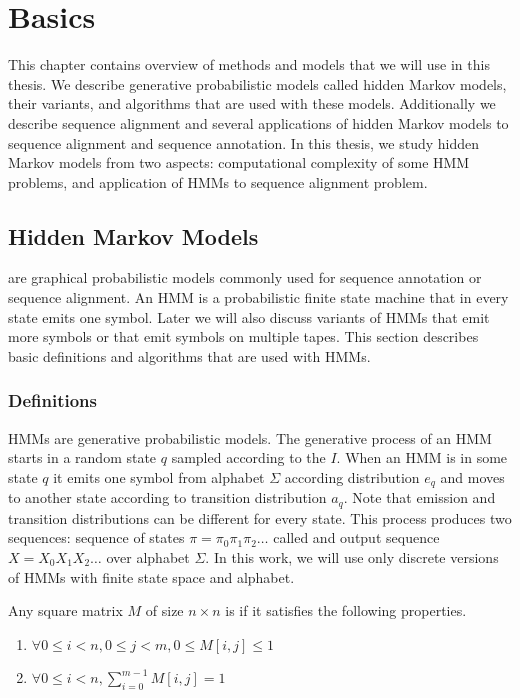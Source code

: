 \chapter{Basics}
\label{CHAPTER:BASICS}

This chapter contains overview of methods and models that we will use in this
thesis. We describe generative probabilistic models called hidden Markov
models, their variants, and algorithms that are used with these models.
Additionally we describe sequence alignment and several applications of hidden
Markov models to sequence alignment and sequence annotation. In this thesis, we
study hidden Markov models from two aspects: computational complexity of some
HMM problems, and application of HMMs to sequence alignment problem.

\section{Hidden Markov Models}
 are graphical probabilistic models
commonly used for sequence annotation or sequence alignment. An HMM is a
probabilistic finite state machine that in every state emits one symbol. Later
we will also discuss variants of HMMs that emit more symbols or that emit
symbols on multiple tapes. This section describes basic definitions
and algorithms that are used with HMMs.

\subsection{Definitions}\label{SECTION:HMMDEF}
                       
HMMs are generative probabilistic models.
The generative process of an HMM starts in a random state $q$ sampled according
to the  $I$.  When an HMM is in some state $q$ it emits one symbol from
alphabet $\Sigma$ according distribution $e_q$ and moves to another state
according to transition distribution $a_q$. Note that emission and transition
distributions can be different for every state.  This process produces two
sequences: sequence of states $\pi=\pi_0\pi_1\pi_2\dots$ called
 and output sequence $X=X_0X_1X_2\dots$ over alphabet
$\Sigma$. In this work, we will use only discrete versions of HMMs with finite state
space and alphabet.  


\begin{definition}
Any square matrix $M$ of size $n\times n$ is  if it satisfies the
following properties.
\begin{enumerate}[itemsep=-1mm]
\item $\forall 0\leq i<n,0\leq j < m, 0\leq M[i,j]\leq 1$
\item $\forall 0\le i<n, \sum_{i=0}^{m-1}M[i,j]=1$
\end{enumerate}
\end{definition}

